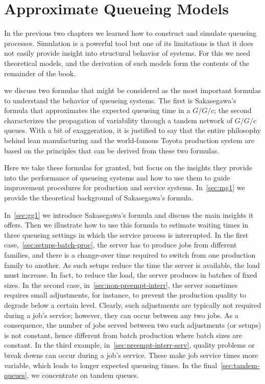 \chapter{Approximate Queueing Models}
\label{cha:approximate-models}


In the previous two chapters we learned how to construct and simulate queueing processes.
Simulation is a powerful tool but one of its limitations is that it does not easily provide insight into structural behavior of systems.
For this we need theoretical models, and the derivation of such models form the contents of the remainder of the book.


 we discuss two formulas that might be considered as the most important formulas to understand the behavior of queueing systems.
The first is Sakasegawa's formula that approximates the expected queueing time in a $G/G/c$; the second characterizes the propagation of variability through a tandem network of $G/G/c$ queues.
With a bit of exaggeration, it is justified to say that the entire philosophy behind lean manufacturing and the world-famous Toyota production system are based on the principles that can be derived from these two formulas.

Here we take these formulas for granted, but focus on the insights they provide into the performance of queueing systems and how to use them to guide improvement procedures for production and service systems. In~\cref{sec:mg1} we provide the theoretical background of Sakasegawa's formula.


In~\cref{sec:gg1} we introduce Sakasegawa's formula and discuss the main insights it offers.
Then we illustrate how to use this formula to estimate waiting times in three queueing settings in which the service process is interrupted.
In the first case,~\cref{sec:setups-batch-proc}, the server has to produce jobs from different families, and there is a change-over time required to switch from one production family to another.
As such setups reduce the time the server is available, the load must increase.
In fact, to reduce the load, the server produces in batches of fixed sizes.
In the second case, in~\cref{sec:non-preempt-interr}, the server sometimes requires small adjustments, for instance, to prevent the production quality to degrade below a certain level.
Clearly, such adjustments are typically not required during a job's service; however, they can occur between any two jobs.
As a consequence, the number of jobs served between two such adjustments (or setups) is not constant, hence different from batch production where  batch sizes are constant.
In the third example, in~\cref{sec:preempt-interr-serv}, quality problems or break downs can occur during a job's service.
These make job service times more variable, which leads to longer expected queueing times.
In the final~\cref{sec:tandem-queues}, we concentrate on tandem queues.

